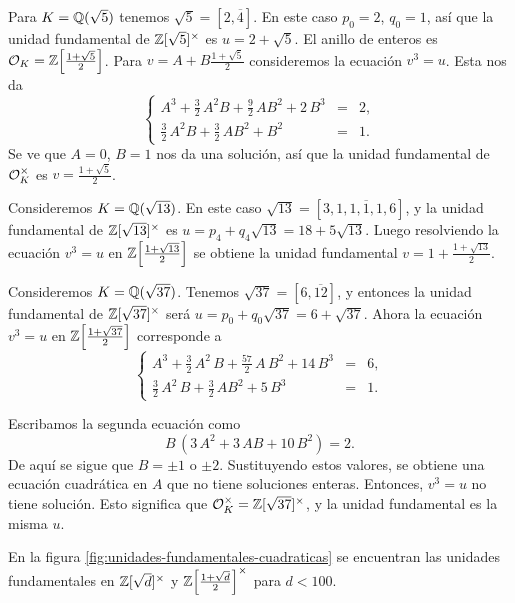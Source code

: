 \begin{ejemplo}
  Para $K = \mathbb{Q} (\sqrt{5})$ tenemos $\sqrt{5} = [2,\overline{4}]$.
  En este caso $p_0 = 2$, $q_0 = 1$, así que la unidad fundamental de
  $\mathbb{Z} [\sqrt{5}]^\times$ es $u = 2 + \sqrt{5}$. El anillo de enteros
  es $\mathcal{O}_K = \mathbb{Z} \Bigl[\frac{1+\sqrt{5}}{2}\Bigr]$. Para
  $v = A + B\frac{1+\sqrt{5}}{2}$ consideremos la ecuación $v^3 = u$.
  Esta nos da
  \[ \left\{\begin{array}{rcl}
  A^3 + \frac{3}{2}\,A^2 B + \frac{9}{2}\,A B^2 + 2\,B^3 & = & 2,\\
  \frac{3}{2}\,A^2 B + \frac{3}{2}\,A B^2 + B^2 & = & 1.
  \end{array}\right. \]
  Se ve que $A = 0$, $B = 1$ nos da una solución, así que la unidad fundamental
  de $\mathcal{O}_K^\times$ es $v = \frac{1+\sqrt{5}}{2}$.
\end{ejemplo}

\begin{ejemplo}
  Consideremos $K = \mathbb{Q} (\sqrt{13})$. En este caso
  $\sqrt{13} = [3, \overline{1,1,1,1,6}]$, y la unidad fundamental de
  $\mathbb{Z} [\sqrt{13}]^\times$ es $u = p_4 + q_4\sqrt{13} = 18 + 5\sqrt{13}$.
  Luego resolviendo la ecuación $v^3 = u$ en
  $\mathbb{Z} \Bigl[\frac{1+\sqrt{13}}{2}\Bigr]$ se obtiene
  la unidad fundamental $v = 1 + \frac{1 + \sqrt{13}}{2}$.
\end{ejemplo}

\begin{ejemplo}
  Consideremos $K = \mathbb{Q} (\sqrt{37})$. Tenemos $\sqrt{37} = [6,\overline{12}]$,
  y entonces la unidad fundamental de $\mathbb{Z} [\sqrt{37}]^\times$ será
  $u = p_0 + q_0\sqrt{37} = 6 + \sqrt{37}$. Ahora la ecuación $v^3 = u$ en
  $\mathbb{Z} \Bigl[\frac{1+\sqrt{37}}{2}\Bigr]$ corresponde a
  \[ \left\{\begin{array}{rcl}
  A^3 + \frac{3}{2}\,A^2\,B + \frac{57}{2}\,A\,B^2 + 14\,B^3 & = & 6,\\
  \frac{3}{2}\,A^2\,B + \frac{3}{2}\,A B^2 + 5\,B^3 & = & 1.
  \end{array}\right. \]

  Escribamos la segunda ecuación como
  $$B\,(3\,A^2 + 3\,AB + 10\,B^2) = 2.$$
  De aquí se sigue que $B = \pm 1$ o $\pm 2$. Sustituyendo estos valores,
  se obtiene una ecuación cuadrática en $A$ que no tiene soluciones enteras.
  Entonces, $v^3 = u$ no tiene solución. Esto significa que
  $\mathcal{O}_K^\times = \mathbb{Z} [\sqrt{37}]^\times$, y la unidad fundamental es la misma
  $u$.
\end{ejemplo}

En la figura \ref{fig:unidades-fundamentales-cuadraticas} se encuentran las
unidades fundamentales en $\mathbb{Z} [\sqrt{d}]^\times$ y
$\mathbb{Z} \Bigl[\frac{1+\sqrt{d}}{2}\Bigr]^\times$ para $d < 100$.

